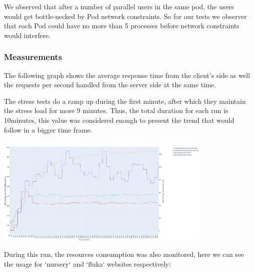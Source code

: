 We observed that after a number of parallel users in the same pod, the users would get bottle-necked by Pod network constraints. So for our tests we observer that each Pod could have no more than 5 processes before network constraints would interfere.



\subsubsection{Measurements}

The following graph shows the average response time from the client's side as well the requests per second handled from the server side at the same time. 

The stress tests do a ramp up during the first minute, after which they maintain the stress load for more 9 minutes.
Thus, the total duration for each run is 10minutes, this value was considered enough to present the trend that would follow in a bigger time frame.

\includegraphics[width=400]{figures/experiment-figures/critical_run.png}

During this run, the resources consumption was also monitored, here we can see the usage for `nursery` and `fluka` websites respectively:

